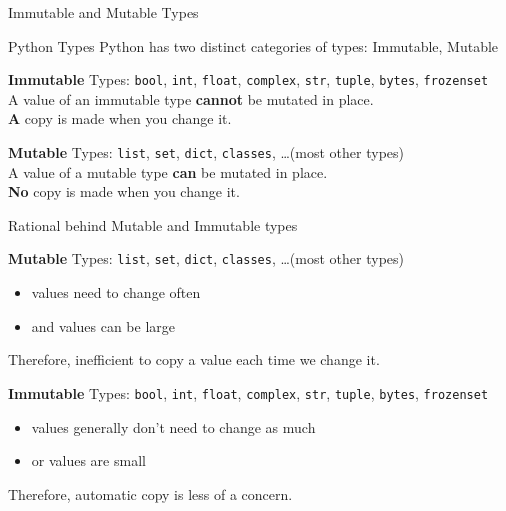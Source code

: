 \documentclass[10pt, colorlinks=true, urlcolor=blue]{beamer}
\begin{document}
\begin{frame}{Immutable and Mutable Types}
  \begin{block}{Python Types}
    Python has two distinct categories of types: Immutable, Mutable
  \end{block}
  
  \vspace{2.4em}
  
  \textbf{Immutable} Types: \texttt{bool}, \texttt{int}, \texttt{float}, \texttt{complex}, \texttt{str}, \texttt{tuple}, \texttt{bytes}, \texttt{frozenset} \\
  
  \vspace{-0.8em}
  A value of an immutable type \textbf{cannot} be mutated in place. \\
  \textbf{A} copy is made when you change it. \\
  
  \vspace{2.0em}
  
  \textbf{Mutable} Types: \texttt{list}, \texttt{set}, \texttt{dict}, \texttt{classes}, \dots (most other types) \\
  
  \vspace{-0.8em}
  A value of a mutable type \textbf{can} be mutated in place. \\
  \textbf{No} copy is made when you change it.
\end{frame}

\begin{frame}{Rational behind Mutable and Immutable types}
 
  \textbf{Mutable} Types: \texttt{list}, \texttt{set}, \texttt{dict}, \texttt{classes}, \dots (most other types)
  \begin{itemize}
  \item values need to change often
  \item and values can be large
  \end{itemize}
  Therefore, inefficient to copy a value each time we change it.
  
  \vspace{3em}
  
  \textbf{Immutable} Types: \texttt{bool}, \texttt{int}, \texttt{float}, \texttt{complex}, \texttt{str}, \texttt{tuple}, \texttt{bytes}, \texttt{frozenset}
  \begin{itemize}
  \item values generally don't need to change as much
  \item or values are small
  \end{itemize}
  Therefore, automatic copy is less of a concern.

  \vspace{2em}
  
\end{frame}
\end{document}

